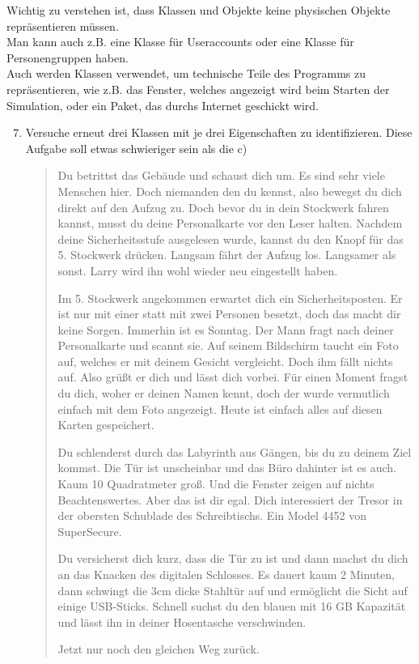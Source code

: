     \begin{Infobox}
        Wichtig zu verstehen ist, dass Klassen und Objekte keine physischen Objekte repräsentieren müssen.\\
        Man kann auch z.B. eine Klasse für Useraccounts oder eine Klasse für Personengruppen haben.\\
        Auch werden Klassen verwendet, um technische Teile des Programms zu repräsentieren, wie z.B. das Fenster, welches angezeigt wird beim Starten der Simulation, oder ein Paket, das durchs Internet geschickt wird.
    \end{Infobox}

\begin{enumerate} \setcounter{enumi}{6}
    \item \optional Versuche erneut drei Klassen mit je drei Eigenschaften  zu identifizieren. Diese Aufgabe soll etwas schwieriger sein als die c)
    \begin{quotation}
    Du betrittst das Gebäude und schaust dich um.
    Es sind sehr viele Menschen hier.
    Doch niemanden den du kennst, also bewegst du dich direkt auf den Aufzug zu.
    Doch bevor du in dein Stockwerk fahren kannst, musst du deine Personalkarte vor den Leser halten.
    Nachdem deine Sicherheitsstufe ausgelesen wurde, kannst du den Knopf für das 5. Stockwerk drücken.
    Langsam fährt der Aufzug los.
    Langsamer als sonst.
    Larry wird ihn wohl wieder neu eingestellt haben.

    Im 5. Stockwerk angekommen erwartet dich ein Sicherheitsposten.
    Er ist nur mit einer statt mit zwei Personen besetzt, doch das macht dir keine Sorgen.
    Immerhin ist es Sonntag.
    Der Mann fragt nach deiner Personalkarte und scannt sie.
    Auf seinem Bildschirm taucht ein Foto auf, welches er mit deinem Gesicht vergleicht.
    Doch ihm fällt nichts auf.
    Also grüßt er dich und lässt dich vorbei.
    Für einen Moment fragst du dich, woher er deinen Namen kennt, doch der wurde vermutlich einfach mit dem Foto angezeigt.
    Heute ist einfach alles auf diesen Karten gespeichert.

    Du schlenderst durch das Labyrinth aus Gängen, bis du zu deinem Ziel kommst.
    Die Tür ist unscheinbar und das Büro dahinter ist es auch.
    Kaum 10 Quadratmeter groß.
    Und die Fenster zeigen auf nichts Beachtenswertes.
    Aber das ist dir egal.
    Dich interessiert der Tresor in der obersten Schublade des Schreibtischs.
    Ein Model 4452 von SuperSecure.

    Du versicherst dich kurz, dass die Tür zu ist und dann machst du dich an das Knacken des digitalen Schlosses.
    Es dauert kaum 2 Minuten, dann schwingt die 3cm dicke Stahltür auf und ermöglicht die Sicht auf einige USB-Sticks.
    Schnell suchst du den blauen mit 16 GB Kapazität und lässt ihn in deiner Hosentasche verschwinden.

    Jetzt nur noch den gleichen Weg zurück.
    \end{quotation}
\end{enumerate}
